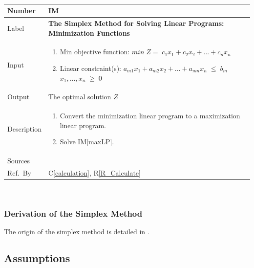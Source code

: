 \documentclass[12pt]{article}
\newcommand{\colAwidth}{0.13\textwidth}
\newcommand{\colBwidth}{0.82\textwidth}
\newcommand{\calcref}[1]{C\ref{#1}}
\newcounter{instnum} %
\newcommand{\iref}[1]{IM\ref{#1}}
\newcommand{\rref}[1]{R\ref{#1}}
\begin{document}
~\newline

\noindent
\begin{minipage}{\textwidth}
	\renewcommand*{\arraystretch}{1.5}
	\begin{tabular}{| p{\colAwidth} | p{\colBwidth}|}
		\hline
		\rowcolor[gray]{0.9}
		Number& IM{instnum}\theinstnum \label{minLP}\\
		\hline
		Label& \bf The Simplex Method for Solving Linear Programs: Minimization 
		Functions\\
		\hline
		Input& 
		\begin{enumerate}
			\item Min objective function: $min\;Z=\;c_{1}x_1 + c_{2}x_2 + ... + 
			c_{n}x_n$
			
			\item Linear constraint(s): 
			\newline$a_{m1}x_1 + a_{m2}x_2 + ... + a_{mn}x_n\;{\leq}\;b_m$
			\newline$x_1, ..., x_n\;{\geq}\;0$
		\end{enumerate}\\
		\hline
		Output& The optimal solution $Z$\\
		\hline
		Description& 
		\begin{enumerate}
			\item Convert the minimization linear program to a maximization 
			linear program.
			
			\item Solve \iref{maxLP}.
		\end{enumerate}
		\\
		\hline
		Sources& \cite{lp-defs}\\
		\hline
		Ref.\ By & \calcref{calculation}, \rref{R_Calculate} \\
		\hline
	\end{tabular}
\end{minipage}\\

\subsubsection*{Derivation of the Simplex Method}{
	The origin of the simplex method is detailed in \cite{simplex-origin}. 
}

\subsection{Assumptions}
\end{document}
